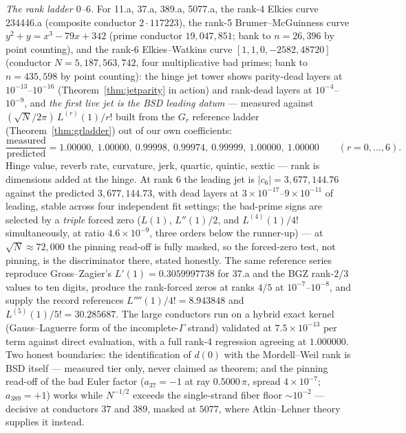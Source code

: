 \documentclass[11pt]{article}
\begin{document}
\emph{The rank ladder $0$--$6$.}  For 11.a, 37.a, 389.a, 5077.a, the rank-4 Elkies curve 234446.a
(composite conductor $2\cdot117223$), the rank-5 Brumer--McGuinness curve
$y^2+y=x^3-79x+342$ (prime conductor $19{,}047{,}851$; bank to $n=26{,}396$ by point counting), and
the rank-6 Elkies--Watkins curve $[1,1,0,-2582,48720]$ (conductor $N=5{,}187{,}563{,}742$, four
multiplicative bad primes; bank to $n=435{,}598$ by point counting): the
hinge jet tower shows parity-dead layers at $10^{-13}$--$10^{-16}$ (Theorem~\ref{thm:jetparity} in
action) and rank-dead layers at $10^{-4}$--$10^{-9}$, and \emph{the first live jet is the BSD
leading datum} --- measured against $(\sqrt N/2\pi)\,L^{(r)}(1)/r!$ built from the $G_r$ reference
ladder (Theorem~\ref{thm:grladder}) out of our own coefficients:
\[
  \frac{\text{measured}}{\text{predicted}} = 1.00000,\ 1.00000,\ 0.99998,\ 0.99974,\ 0.99999,\ 1.00000,\ 1.00000
  \qquad (r=0,\dots,6).
\]
Hinge value, reverb rate, curvature, jerk, quartic, quintic, sextic --- rank is dimensions added at
the hinge.  At rank $6$ the leading jet is $|c_6|=3{,}677{,}144.76$ against the predicted
$3{,}677{,}144.73$, with dead layers at $3\times10^{-17}$--$9\times10^{-11}$ of leading, stable
across four independent fit settings; the bad-prime signs are selected by a \emph{triple} forced
zero ($L(1)$, $L''(1)/2$, and $L^{(4)}(1)/4!$ simultaneously, at ratio $4.6\times10^{-9}$, three
orders below the runner-up) --- at $\sqrt N\approx72{,}000$ the pinning read-off is fully masked,
so the forced-zero test, not pinning, is the discriminator there, stated honestly.  The same reference series reproduce Gross--Zagier's $L'(1)=0.3059997738$ for 37.a and the
BGZ rank-$2$/$3$ values to ten digits, produce the rank-forced zeros at ranks $4$/$5$ at
$10^{-7}$--$10^{-8}$, and supply the record references $L''''(1)/4!=8.943848$ and
$L^{(5)}(1)/5!=30.285687$.  The large conductors run on a hybrid exact kernel (Gauss--Laguerre form
of the incomplete-$\Gamma$ strand) validated at $7.5\times10^{-13}$ per term against direct
evaluation, with a full rank-4 regression agreeing at $1.000000$.  Two honest boundaries: the
identification of $d(0)$ with the Mordell--Weil rank is BSD itself --- measured tier only, never
claimed as theorem; and the pinning read-off of the bad Euler factor ($a_{37}=-1$ at ray
$0.5000\,\pi$, spread $4\times10^{-7}$; $a_{389}=+1$) works while $N^{-1/2}$ exceeds the
single-strand fiber floor ${\sim}10^{-2}$ --- decisive at conductors $37$ and $389$, masked at
$5077$, where Atkin--Lehner theory supplies it instead.
\end{document}
